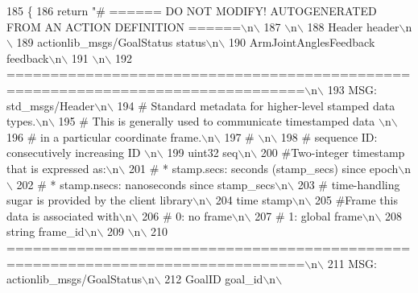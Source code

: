 \begin{DoxyCode}
185   \{
186     \textcolor{keywordflow}{return} \textcolor{stringliteral}{"# ====== DO NOT MODIFY! AUTOGENERATED FROM AN ACTION DEFINITION ======\(\backslash\)n\(\backslash\)}
187 \textcolor{stringliteral}{\(\backslash\)n\(\backslash\)}
188 \textcolor{stringliteral}{Header header\(\backslash\)n\(\backslash\)}
189 \textcolor{stringliteral}{actionlib\_msgs/GoalStatus status\(\backslash\)n\(\backslash\)}
190 \textcolor{stringliteral}{ArmJointAnglesFeedback feedback\(\backslash\)n\(\backslash\)}
191 \textcolor{stringliteral}{\(\backslash\)n\(\backslash\)}
192 \textcolor{stringliteral}{================================================================================\(\backslash\)n\(\backslash\)}
193 \textcolor{stringliteral}{MSG: std\_msgs/Header\(\backslash\)n\(\backslash\)}
194 \textcolor{stringliteral}{# Standard metadata for higher-level stamped data types.\(\backslash\)n\(\backslash\)}
195 \textcolor{stringliteral}{# This is generally used to communicate timestamped data \(\backslash\)n\(\backslash\)}
196 \textcolor{stringliteral}{# in a particular coordinate frame.\(\backslash\)n\(\backslash\)}
197 \textcolor{stringliteral}{# \(\backslash\)n\(\backslash\)}
198 \textcolor{stringliteral}{# sequence ID: consecutively increasing ID \(\backslash\)n\(\backslash\)}
199 \textcolor{stringliteral}{uint32 seq\(\backslash\)n\(\backslash\)}
200 \textcolor{stringliteral}{#Two-integer timestamp that is expressed as:\(\backslash\)n\(\backslash\)}
201 \textcolor{stringliteral}{# * stamp.secs: seconds (stamp\_secs) since epoch\(\backslash\)n\(\backslash\)}
202 \textcolor{stringliteral}{# * stamp.nsecs: nanoseconds since stamp\_secs\(\backslash\)n\(\backslash\)}
203 \textcolor{stringliteral}{# time-handling sugar is provided by the client library\(\backslash\)n\(\backslash\)}
204 \textcolor{stringliteral}{time stamp\(\backslash\)n\(\backslash\)}
205 \textcolor{stringliteral}{#Frame this data is associated with\(\backslash\)n\(\backslash\)}
206 \textcolor{stringliteral}{# 0: no frame\(\backslash\)n\(\backslash\)}
207 \textcolor{stringliteral}{# 1: global frame\(\backslash\)n\(\backslash\)}
208 \textcolor{stringliteral}{string frame\_id\(\backslash\)n\(\backslash\)}
209 \textcolor{stringliteral}{\(\backslash\)n\(\backslash\)}
210 \textcolor{stringliteral}{================================================================================\(\backslash\)n\(\backslash\)}
211 \textcolor{stringliteral}{MSG: actionlib\_msgs/GoalStatus\(\backslash\)n\(\backslash\)}
212 \textcolor{stringliteral}{GoalID goal\_id\(\backslash\)n\(\backslash\)}

\end{DoxyCode}

